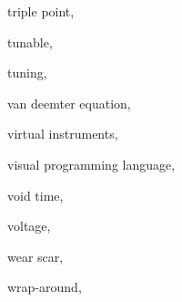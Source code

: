 \begin{theindex}
  \item \lowercase {triple point}, 
  \item \lowercase {tunable}, 
  \item \lowercase {tuning}, 
  \item \lowercase {van Deemter equation}, 
  \item \lowercase {virtual instruments}, 
  \item \lowercase {visual programming language}, 
  \item \lowercase {void time}, 
  \item \lowercase {voltage}, 
  \item \lowercase {wear scar}, 
  \item \lowercase {wrap-around}, 

\end{theindex}
 